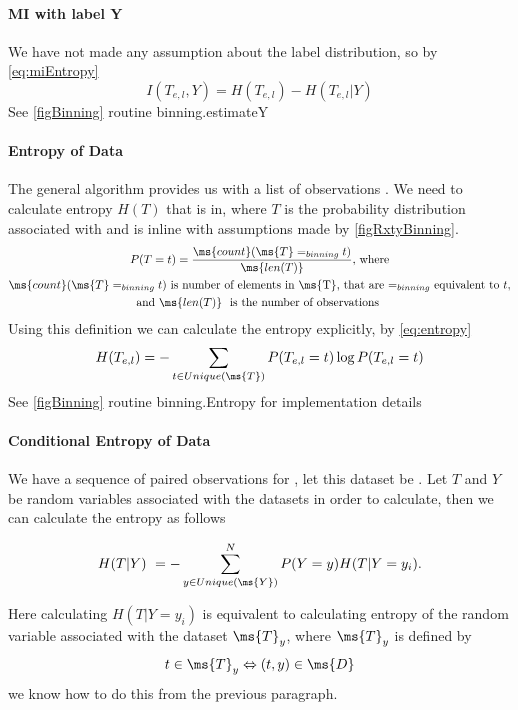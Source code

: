 \documentclass[dissertation.tex]{subfiles}
\begin{document}
\paragraph{MI with label Y}
We have not made any assumption about the label distribution, so by
\autoref{eq:miEntropy}
\begin{equation}
  I(T_{e,l}, Y) = H(T_{e,l}) - H(T_{e,l}|Y)
\end{equation}
See \autoref{figBinning} routine binning.estimateY

\paragraph{Entropy of Data}
The general algorithm provides us with a list of observations .
We need to calculate entropy $H(T)$ that is in, where $T$ is the probability
distribution associated with  and is inline with assumptions made by
\autoref{figRxtyBinning}.
\begin{gather}
  P(T = t) = \frac{\ms{count}(\ms{T} =_{binning} t)}{\ms{len(T)}}
  \text{, where}\\
  \ms{count}(\ms{T} =_{binning} t)
  \text{ is number of elements in \ms{T}, that are $=_{binning}$ equivalent to }t,
  \nonumber\\
  \text{and }
  \ms{len(T)}\
  \text{ is the number of observations }\nonumber
\end{gather}
Using this definition we can calculate the entropy explicitly, by
\autoref{eq:entropy}
\begin{equation}
  H(T_{e,l})=-\sum _{t\in{Unique(\ms{T})}}{P (T_{e,l}=t)\log P(T_{e,l}=t)}
\end{equation}
See \autoref{figBinning} routine binning.Entropy for implementation details

\paragraph{Conditional Entropy of Data}
We have a sequence of paired observations  for ,
let this dataset be \ms{D}. Let $T$ and $Y$ be random variables associated with
the datasets in order to calculate, then we can calculate the entropy as follows


\begin{equation}
  H(T|Y)\ =-\sum _{y\in{Unique(\ms{Y})}}^NP(Y=y)H(T|Y=y_i).
\end{equation}

Here calculating $H(T|Y=y_i)$ is equivalent to calculating entropy of the random
variable associated with the dataset $\ms{T}_y$, where $\ms{T}_y$ is defined by
\begin{equation}
  t\in\ms{T}_y
  \Leftrightarrow
  (t,y)\in\ms{D}
\end{equation}
we know how to do this from the previous paragraph.
\end{document}

